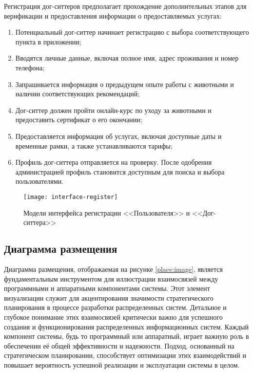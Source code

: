 Регистрация дог-ситтеров предполагает прохождение дополнительных этапов для верификации и предоставления информации о предоставляемых услугах:
\begin{enumerate}
    \item Потенциальный дог-ситтер начинает регистрацию с выбора соответствующего пункта в приложении;
    \item Вводятся личные данные, включая полное имя, адрес проживания и номер телефона;
    \item Запрашивается информация о предыдущем опыте работы с животными и наличии соответствующих рекомендаций;
    \item Дог-ситтер должен пройти онлайн-курс по уходу за животными и предоставить сертификат о его окончании;
    \item Предоставляется информация об услугах, включая доступные даты и временные рамки, а также устанавливаются тарифы;
    \item Профиль дог-ситтера отправляется на проверку. После одобрения администрацией профиль становится доступным для поиска и выбора пользователями.
\end{enumerate}


\begin{figure}[h!]
    \texttt{[image: interface-register]}
    \caption{Модели интерфейса регистрации <<Пользователя>> и <<Дог-ситтера>>}
    \label{fig:register}
\end{figure}

\subsection{Диаграмма размещения}

Диаграмма размещения, отображаемая на рисунке \ref{place:image}, является фундаментальным инструментом для иллюстрации взаимосвязей между программными и аппаратными компонентами системы. Этот элемент визуализации служит для акцентирования значимости стратегического планирования в процессе разработки распределенных систем. Детальное и глубокое понимание этих взаимосвязей критически важно для успешного создания и функционирования распределенных информационных систем\cite{makni}. Каждый компонент системы, будь то программный или аппаратный, играет важную роль в обеспечении её общей эффективности и надежности. Подход, основанный на стратегическом планировании, способствует оптимизации этих взаимодействий и повышает вероятность успешной реализации и эксплуатации системы в целом.

